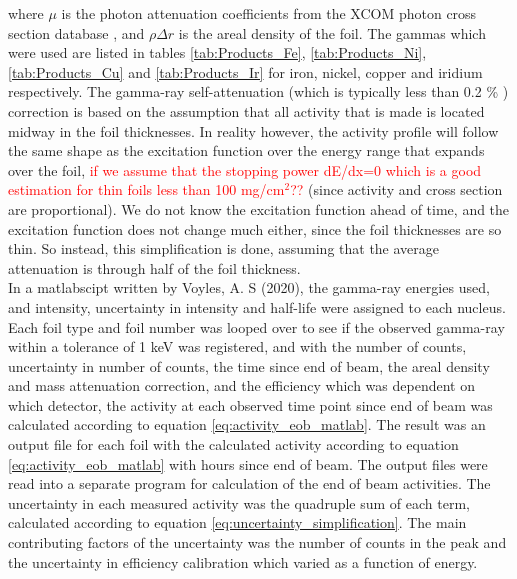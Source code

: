 where $\mu$ is the photon attenuation coefficients from the XCOM photon cross section database \cite{M.J.BergerJ.H.HubbellS.M.SeltzerJ.ChangJ.S.CourseyR.SukumarD.S.Zucker2010}%
, and $\rho\Delta r$ is the areal density of the foil. The gammas which were used are listed in tables \ref{tab:Products_Fe}, \ref{tab:Products_Ni}, \ref{tab:Products_Cu} and \ref{tab:Products_Ir} for iron, nickel, copper and iridium respectively. The gamma-ray self-attenuation (which is typically less than 0.2 \% \cite{Voyles2019}) correction is based on the assumption that all activity that is made is located midway in the foil thicknesses. In reality however, the activity profile will follow the same shape as the excitation function over the energy range that expands over the foil, \textcolor{red}{if we assume that the stopping power dE/dx=0 which is a good estimation for thin foils less than 100 mg/cm$^2$??} (since activity and cross section are proportional). We do not know the excitation function ahead of time, and the excitation function does not change much either, since the foil thicknesses are so thin. So instead, this simplification is done, assuming that the average attenuation is through half of the foil thickness. \\ 

In a matlabscipt written by Voyles, A. S (2020), the gamma-ray energies used, and intensity, uncertainty in intensity and half-life were assigned to each nucleus. Each foil type and foil number was looped over to see if the observed gamma-ray within a tolerance of 1 keV was registered, and with the number of counts, uncertainty in number of counts, the time since end of beam, the areal density and mass attenuation correction, and the efficiency which was dependent on which detector, the activity at each observed time point since end of beam was calculated according to equation \ref{eq:activity_eob_matlab}. The result was an output file for each foil with the calculated activity according to equation \ref{eq:activity_eob_matlab} with hours since end of beam. The output files were read into a separate program for calculation of the end of beam activities. The uncertainty in each measured activity was the quadruple sum of each term, calculated according to equation \ref{eq:uncertainty_simplification}. The main contributing factors of the uncertainty was the number of counts in the peak and the uncertainty in efficiency calibration which varied as a function of energy. \\ %


